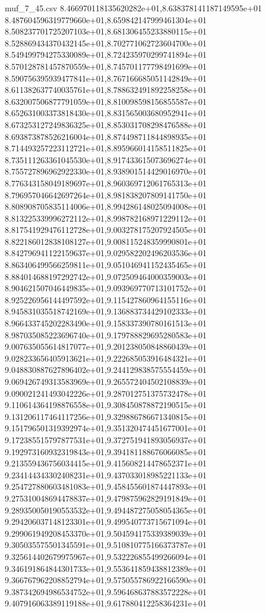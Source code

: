 \begin{filecontents*}{muf_7_45.csv}
8.466970118135620282e+01,8.638378141187149595e+01
8.487604596319779660e+01,8.659842147999461304e+01
8.508237701725207103e+01,8.681306455233880115e+01
8.528869434370432145e+01,8.702771062723604700e+01
8.549499794275330089e+01,8.724235970299741894e+01
8.570128781457870559e+01,8.745701177798491699e+01
8.590756395939477841e+01,8.767166685051142849e+01
8.611382637740035761e+01,8.788632491892258258e+01
8.632007506877791059e+01,8.810098598156855587e+01
8.652631003373818430e+01,8.831565003680952941e+01
8.673253127249836325e+01,8.853031708298476588e+01
8.693873878526216004e+01,8.874498711844898935e+01
8.714493257223112721e+01,8.895966014158511825e+01
8.735111263361045530e+01,8.917433615073696274e+01
8.755727896962922330e+01,8.938901514429016970e+01
8.776343158049189697e+01,8.960369712061765313e+01
8.796957046642697264e+01,8.981838207809141750e+01
8.808908705835114006e+01,8.994286148025094008e+01
8.813225339996272112e+01,8.998782168971229112e+01
8.817541929476112728e+01,9.003278175207924505e+01
8.822186012838108127e+01,9.008115248359990801e+01
8.842796941122159637e+01,9.029582202496203536e+01
8.863406499566259811e+01,9.051046941152435465e+01
8.884014688197292742e+01,9.072509464000359003e+01
8.904621507046449835e+01,9.093969770713101752e+01
8.925226956144497592e+01,9.115427860964155116e+01
8.945831035518742169e+01,9.136883734429102333e+01
8.966433745202283490e+01,9.158337390780161513e+01
8.987035085223696740e+01,9.179788829695280583e+01
9.007635055614817077e+01,9.201238050848860439e+01
9.028233656405913621e+01,9.222685053916484321e+01
9.048830887627896402e+01,9.244129838575554459e+01
9.069426749313583969e+01,9.265572404502108839e+01
9.090021241493042226e+01,9.287012751375732478e+01
9.110614364198876558e+01,9.308450878872190515e+01
9.131206117464117256e+01,9.329886786671340815e+01
9.151796501319392974e+01,9.351320474451677001e+01
9.172385515797877531e+01,9.372751941893056937e+01
9.192973160932319843e+01,9.394181188676066085e+01
9.213559436756034415e+01,9.415608214478652371e+01
9.234144343302408231e+01,9.437033018985221133e+01
9.254727880603481083e+01,9.458455601874447893e+01
9.275310048694478837e+01,9.479875962829191849e+01
9.289350050190553532e+01,9.494487275058054365e+01
9.294206037148123301e+01,9.499540773715671094e+01
9.299061949208453370e+01,9.504594175339389039e+01
9.305035575501345591e+01,9.510810775166373787e+01
9.325614402679975967e+01,9.532226855499266094e+01
9.346191864844301733e+01,9.553641859438812389e+01
9.366767962208852794e+01,9.575055786922166590e+01
9.387342694986534752e+01,9.596468637883572228e+01
9.407916063389119188e+01,9.617880412258364231e+01

\end{filecontents*}

